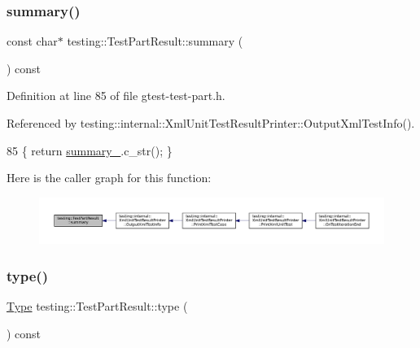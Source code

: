 \subsubsection{\texorpdfstring{summary()}{summary()}}
{\footnotesize\ttfamily const char$\ast$ testing\+::\+Test\+Part\+Result\+::summary (\begin{DoxyParamCaption}{ }\end{DoxyParamCaption}) const\hspace{0.3cm}{\ttfamily [inline]}}



Definition at line 85 of file gtest-\/test-\/part.\+h.



Referenced by testing\+::internal\+::\+Xml\+Unit\+Test\+Result\+Printer\+::\+Output\+Xml\+Test\+Info().


\begin{DoxyCode}
85 \{ \textcolor{keywordflow}{return} \hyperlink{classtesting_1_1TestPartResult_a6b9bce29122b56a50295710b7f6e345c}{summary\_}.c\_str(); \}
\end{DoxyCode}
Here is the caller graph for this function\+:
\nopagebreak
\begin{figure}[H]
\begin{center}
\leavevmode
\includegraphics[width=350pt]{classtesting_1_1TestPartResult_a655ab538e510434ba557ad66c35aa42c_icgraph}
\end{center}
\end{figure}
\mbox{\label{classtesting_1_1TestPartResult_aab92b225e8a472e78bd3889ca6df0d2a}} 
\subsubsection{\texorpdfstring{type()}{type()}}
{\footnotesize\ttfamily \hyperlink{classtesting_1_1TestPartResult_a65ae656b33fdfdfffaf34858778a52d5}{Type} testing\+::\+Test\+Part\+Result\+::type (\begin{DoxyParamCaption}{ }\end{DoxyParamCaption}) const\hspace{0.3cm}{\ttfamily [inline]}}



